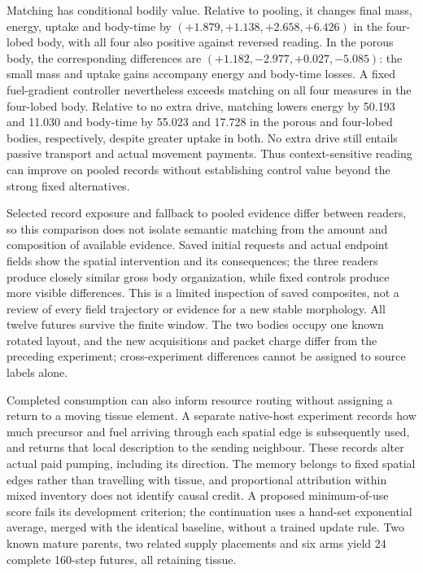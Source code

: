 Matching has conditional bodily value. Relative to pooling, it changes final mass, energy, uptake and body-time by $(+1.879,+1.138,+2.658,+6.426)$ in the four-lobed body, with all four also positive against reversed reading. In the porous body, the corresponding differences are $(+1.182,-2.977,+0.027,-5.085)$: the small mass and uptake gains accompany energy and body-time losses. A fixed fuel-gradient controller nevertheless exceeds matching on all four measures in the four-lobed body. Relative to no extra drive, matching lowers energy by 50.193 and 11.030 and body-time by 55.023 and 17.728 in the porous and four-lobed bodies, respectively, despite greater uptake in both. No extra drive still entails passive transport and actual movement payments. Thus context-sensitive reading can improve on pooled records without establishing control value beyond the strong fixed alternatives.

Selected record exposure and fallback to pooled evidence differ between readers, so this comparison does not isolate semantic matching from the amount and composition of available evidence. Saved initial requests and actual endpoint fields show the spatial intervention and its consequences; the three readers produce closely similar gross body organization, while fixed controls produce more visible differences. This is a limited inspection of saved composites, not a review of every field trajectory or evidence for a new stable morphology. All twelve futures survive the finite window. The two bodies occupy one known rotated layout, and the new acquisitions and packet charge differ from the preceding experiment; cross-experiment differences cannot be assigned to source labels alone.

Completed consumption can also inform resource routing without assigning a return to a moving tissue element. A separate native-host experiment records how much precursor and fuel arriving through each spatial edge is subsequently used, and returns that local description to the sending neighbour. These records alter actual paid pumping, including its direction. The memory belongs to fixed spatial edges rather than travelling with tissue, and proportional attribution within mixed inventory does not identify causal credit. A proposed minimum-of-use score fails its development criterion; the continuation uses a hand-set exponential average, merged with the identical baseline, without a trained update rule. Two known mature parents, two related supply placements and six arms yield 24 complete 160-step futures, all retaining tissue.

